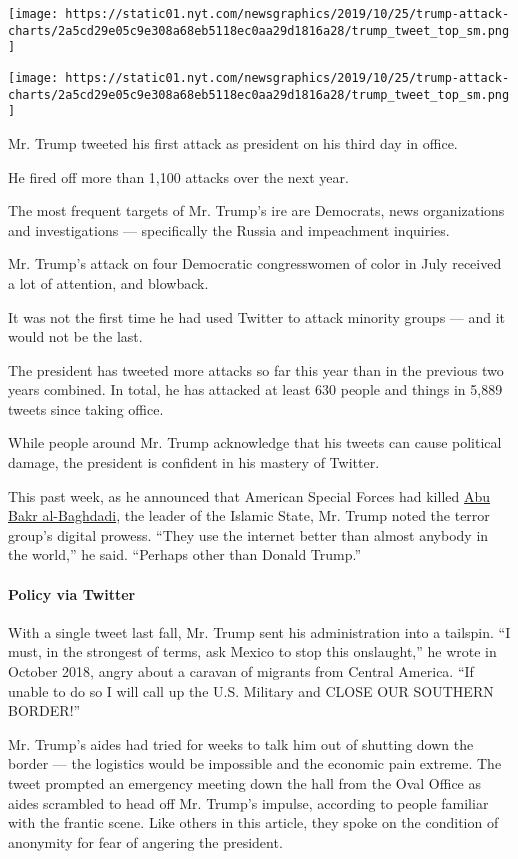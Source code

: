 \texttt{[image: https://static01.nyt.com/newsgraphics/2019/10/25/trump-attack-charts/2a5cd29e05c9e308a68eb5118ec0aa29d1816a28/trump\_tweet\_top\_sm.png]}

\texttt{[image: https://static01.nyt.com/newsgraphics/2019/10/25/trump-attack-charts/2a5cd29e05c9e308a68eb5118ec0aa29d1816a28/trump\_tweet\_top\_sm.png]}

Mr. Trump tweeted his first attack as president on his third day in
office.

He fired off more than 1,100 attacks over the next year.

The most frequent targets of Mr. Trump's ire are Democrats, news
organizations and investigations --- specifically the Russia and
impeachment inquiries.

Mr. Trump's attack on four Democratic congresswomen of color in July
received a lot of attention, and blowback.

It was not the first time he had used Twitter to attack minority groups
--- and it would not be the last.

The president has tweeted more attacks so far this year than in the
previous two years combined. In total, he has attacked at least 630
people and things in 5,889 tweets since taking office.

While people around Mr. Trump acknowledge that his tweets can cause
political damage, the president is confident in his mastery of Twitter.

This past week, as he announced that American Special Forces had killed
\href{https://www.nytimes.com/2019/10/27/world/middleeast/al-baghdadi-dead.html?module=inline}{Abu
Bakr al-Baghdadi}, the leader of the Islamic State, Mr. Trump noted the
terror group's digital prowess. ``They use the internet better than
almost anybody in the world,'' he said. ``Perhaps other than Donald
Trump.''

\hypertarget{policy-via-twitter}{%
\paragraph{Policy via Twitter}\label{policy-via-twitter}}

With a single tweet last fall, Mr. Trump sent his administration into a
tailspin. ``I must, in the strongest of terms, ask Mexico to stop this
onslaught,'' he wrote in October 2018, angry about a caravan of migrants
from Central America. ``If unable to do so I will call up the U.S.
Military and CLOSE OUR SOUTHERN BORDER!''

Mr. Trump's aides had tried for weeks to talk him out of shutting down
the border --- the logistics would be impossible and the economic pain
extreme. The tweet prompted an emergency meeting down the hall from the
Oval Office as aides scrambled to head off Mr. Trump's impulse,
according to people familiar with the frantic scene. Like others in this
article, they spoke on the condition of anonymity for fear of angering
the president.

